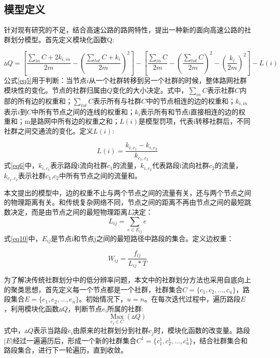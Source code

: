 		\subsection{模型定义}

				针对现有研究的不足，结合高速公路的路网特性，提出一种新的面向高速公路的社群划分模型。首先定义模块化函数Q:

				\begin{equation}
				\vartriangle Q = [\frac{{\sum_{in} C  + 2{k_{i,in}}}}{{2m}} - {(\frac{{\sum_{tot} C  + {k_i}}}{{2m}})^2}] - [\frac{{\sum_{in} C }}{{2m}} - {(\frac{{\sum_{tot} C }}{{2m}})^2} - {(\frac{{{k_i}}}{{2m}})^2}] - L(i)
				\label{eq5}
				\end{equation}
				公式\ref{eq5}用于判断：当节点$i$从一个社群转移到另一个社群的时候，整体路网社群模块性的变化。节点的社群归属由$Q$变化的大小决定。式中，$\sum_{in} C$表示社群$C$内部的所有边的权重和；$\sum_{tot} C$表示所有与社群$C$中的节点相连的边的权重和；$k_{i,in}$表示$i$到$C$中所有节点之间的连线的权重和；$k_i$表示所有和节点i直接相连的边的权重和；m是路网中所有边的权重之和；$L(i)$是模型罚项，代表i转移社群后，不同社群之间交通流的变化。定义$L(i)$:

				\begin{equation}
				L(i)=\frac{{{k_{i,{c_1}}} - {k_{i,{c_2}}}}}{{{k_{{c_1},{c_2}}}}}
				\label{eq6}
				\end{equation}
				式\ref{eq6}中，${k_{i,{c_1}}}$表示路段i流向社群$c_1$的流量，$k_{i,{c_2}}$代表路段i流向社群$c_2$的流量，${{{k_{{c_1},{c_2}}}}}$表示社群$c_1$,$c_2$中所有节点之间的流量和。

				本文提出的模型中，边的权重不止与两个节点之间的流量有关，还与两个节点之间的物理距离有关。和传统复杂网络不同，节点之间的距离不再由节点之间的最短跳数决定，而是由节点之间的最短物理距离$L$决定：
				\begin{equation}
				L_{ij}=\sum\limits_{e \in E_{ij}} {e}
				\label{eq10}
				\end{equation}
				式\ref{eq10}中，$E_{ij}$是节点i和节点j之间的最短路径中路段的集合。定义边权重：


				\begin{equation}
				W_{ij}=\frac{f_{ij}}{L_{ij}*T}
				\label{eq11}
				\end{equation}

				为了解决传统社群划分中的低分辨率问题，本文中的社群划分方法也采用自底向上的聚类思想，首先定义每一个节点都是一个社群，社群集合$C=\{c_1,c_2,\dots,c_u\}$，路段集合$E=\{e_1,e_2,\dots,e_n\}$。初始情况下，$u=n$。在每次迭代过程中，遍历路段$E$，利用模块化函数$\vartriangle Q$，判断节点$e_i$所属的社群:
					$$\mathop{Max}\limits_{c_j\in C} (\vartriangle Q)$$
				式中，$\vartriangle Q$表示当路段$e_i$由原来的社群划分到社群$c_j$时，模块化函数的改变量。路段$|E|$经过一遍遍历后，形成一个新的社群集合$C^1=\{c_1^1,c_2^1,\dots,c_u^1\}$，结合社群集合和路段集合，进行下一轮遍历，直到收敛。

